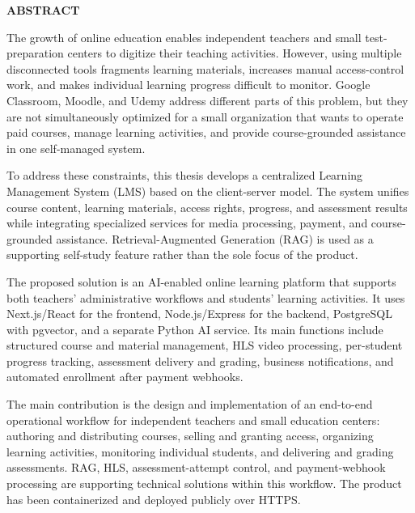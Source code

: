 \documentclass[../DoAn.tex]{subfiles}
\begin{document}
\begin{center}
    \Large{\textbf{ABSTRACT}}\\
\end{center}
\vspace{1cm}

The growth of online education enables independent teachers and small test-preparation centers to digitize their teaching activities. However, using multiple disconnected tools fragments learning materials, increases manual access-control work, and makes individual learning progress difficult to monitor. Google Classroom, Moodle, and Udemy address different parts of this problem, but they are not simultaneously optimized for a small organization that wants to operate paid courses, manage learning activities, and provide course-grounded assistance in one self-managed system.

To address these constraints, this thesis develops a centralized Learning Management System (LMS) based on the client-server model. The system unifies course content, learning materials, access rights, progress, and assessment results while integrating specialized services for media processing, payment, and course-grounded assistance. Retrieval-Augmented Generation (RAG) is used as a supporting self-study feature rather than the sole focus of the product.

The proposed solution is an AI-enabled online learning platform that supports both teachers' administrative workflows and students' learning activities. It uses Next.js/React for the frontend, Node.js/Express for the backend, PostgreSQL with pgvector, and a separate Python AI service. Its main functions include structured course and material management, HLS video processing, per-student progress tracking, assessment delivery and grading, business notifications, and automated enrollment after payment webhooks.

The main contribution is the design and implementation of an end-to-end operational workflow for independent teachers and small education centers: authoring and distributing courses, selling and granting access, organizing learning activities, monitoring individual students, and delivering and grading assessments. RAG, HLS, assessment-attempt control, and payment-webhook processing are supporting technical solutions within this workflow. The product has been containerized and deployed publicly over HTTPS.
\end{document}
